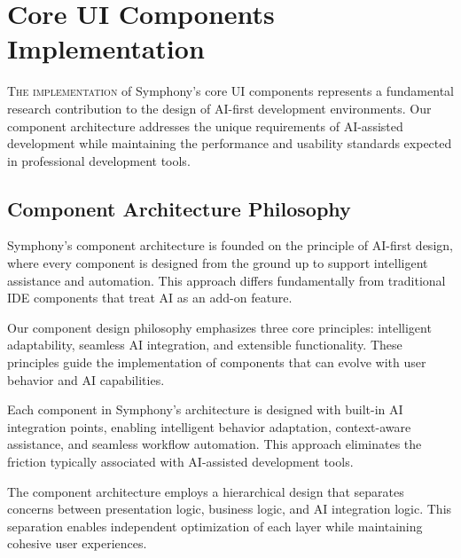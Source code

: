 
\section*{Core UI Components Implementation}

\lettrine{T}{he implementation} of Symphony's core UI components represents a fundamental research contribution to the design of AI-first development environments. Our component architecture addresses the unique requirements of AI-assisted development while maintaining the performance and usability standards expected in professional development tools.

\subsection*{Component Architecture Philosophy}

Symphony's component architecture is founded on the principle of AI-first design, where every component is designed from the ground up to support intelligent assistance and automation. This approach differs fundamentally from traditional IDE components that treat AI as an add-on feature.

Our component design philosophy emphasizes three core principles: intelligent adaptability, seamless AI integration, and extensible functionality. These principles guide the implementation of components that can evolve with user behavior and AI capabilities.

\begin{infobox}[title=AI-First Component Design]
Each component in Symphony's architecture is designed with built-in AI integration points, enabling intelligent behavior adaptation, context-aware assistance, and seamless workflow automation. This approach eliminates the friction typically associated with AI-assisted development tools.
\end{infobox}

The component architecture employs a hierarchical design that separates concerns between presentation logic, business logic, and AI integration logic. This separation enables independent optimization of each layer while maintaining cohesive user experiences.

